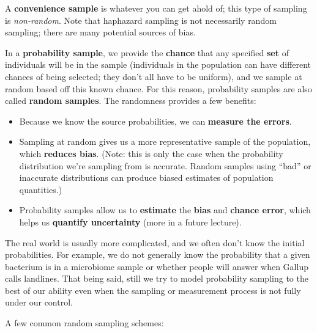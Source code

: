 \documentclass[
  letterpaper,
  DIV=11,
  numbers=noendperiod]{scrreprt}
\providecommand{\tightlist}{%
  \setlength{\itemsep}{0pt}\setlength{\parskip}{0pt}}\usepackage{longtable,booktabs,array}
\begin{document}
A \textbf{convenience sample} is whatever you can get ahold of; this
type of sampling is \emph{non-random}. Note that haphazard sampling is
not necessarily random sampling; there are many potential sources of
bias.

In a \textbf{probability sample}, we provide the \textbf{chance} that
any specified \textbf{set} of individuals will be in the sample
(individuals in the population can have different chances of being
selected; they don't all have to be uniform), and we sample at random
based off this known chance. For this reason, probability samples are
also called \textbf{random samples}. The randomness provides a few
benefits:

\begin{itemize}
\tightlist
\item
  Because we know the source probabilities, we can \textbf{measure the
  errors}.
\item
  Sampling at random gives us a more representative sample of the
  population, which \textbf{reduces bias}. (Note: this is only the case
  when the probability distribution we're sampling from is accurate.
  Random samples using ``bad'' or inaccurate distributions can produce
  biased estimates of population quantities.)
\item
  Probability samples allow us to \textbf{estimate} the \textbf{bias}
  and \textbf{chance error}, which helps us \textbf{quantify
  uncertainty} (more in a future lecture).
\end{itemize}

The real world is usually more complicated, and we often don't know the
initial probabilities. For example, we do not generally know the
probability that a given bacterium is in a microbiome sample or whether
people will answer when Gallup calls landlines. That being said, still
we try to model probability sampling to the best of our ability even
when the sampling or measurement process is not fully under our control.

A few common random sampling schemes:
\end{document}
